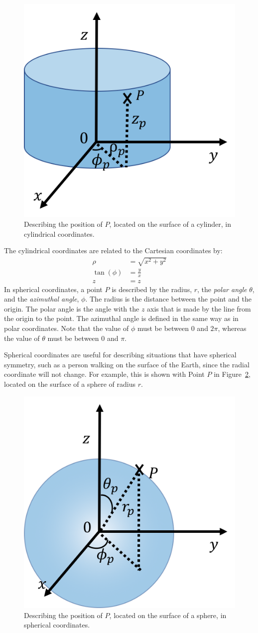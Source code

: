 \begin{figure}[!htbp]
\centering
\includegraphics[width=0.375\linewidth]{files/cylindricalcoordinat-e292782c0e16ae0711a2164dbdb614f9.png}
\caption[]{Describing the position of $P$, located on the surface of a cylinder, in cylindrical coordinates.}
\label{fig:Vectors:cylindricalcoordinates}
\end{figure}

The cylindrical coordinates are related to the Cartesian coordinates by:
\begin{align*}
\rho &= \sqrt{x^2+y^2}\\
\tan(\phi) &= \frac{y}{x}\\
z&=z
\end{align*}
In spherical coordinates, a point $P$ is described by the radius, $r$, the \textit{polar angle} $\theta$, and the \textit{azimuthal angle}, $\phi$. The radius is the distance between the point and the origin. The polar angle is the angle with the $z$ axis that is made by the line from the origin to the point. The azimuthal angle is defined in the same way as in polar coordinates. Note that the value of $\phi$ must be between 0 and $2\pi$, whereas the value of $\theta$ must be between 0 and $\pi$.

Spherical coordinates are useful for describing situations that have spherical symmetry, such as a person walking on the surface of the Earth, since the radial coordinate will not change. For example, this is shown with Point $P$ in Figure~\ref{fig:Vectors:sphericalcoordinates}, located on the surface of a sphere of radius $r$.

\begin{figure}[!htbp]
\centering
\includegraphics[width=0.375\linewidth]{files/sphericalcoordinates-c774e1b2f767c663403face0501b2dda.png}
\caption[]{Describing the position of $P$, located on the surface of a sphere, in spherical coordinates.}
\label{fig:Vectors:sphericalcoordinates}
\end{figure}


